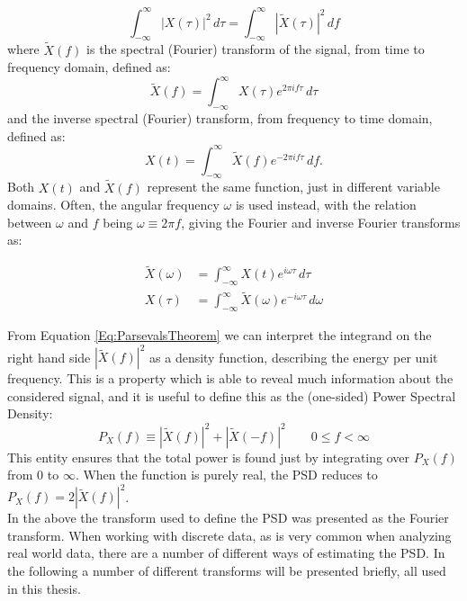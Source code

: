 \documentclass[../../CompleteThesis2/Complete_2ndDraft]{subfiles}
\begin{document}
\begin{equation}
	\int_{-\infty}^{\infty} |X(\tau)|^2 \, d\tau = \int_{-\infty}^{\infty} |\tilde{X}(\tau)|^2\, df
	\label{Eq:ParsevalsTheorem}
\end{equation}
where $\tilde{X}(f)$ is the spectral (Fourier) transform of the signal, from time to frequency domain, defined as:
\begin{equation}
	\tilde{X}(f) = \int_{-\infty}^{\infty} X(\tau) e^{2\pi i f \tau} \, d\tau
	\label{Eq:FourierTransform}
\end{equation}
and the inverse spectral (Fourier) transform, from frequency to time domain, defined as:
\begin{equation}
	X(t) = \int_{-\infty}^{\infty} \tilde{X}(f) e^{-2\pi i f \tau}\, df.
	\label{Eq:InverseFourierTransform}
\end{equation}
Both $X(t)$ and $\tilde{X}(f)$ represent the same function, just in different variable domains. Often, the angular frequency $\omega$ is used instead, with the relation between $\omega$ and $f$ being $\omega \equiv 2\pi f $, giving the Fourier and inverse Fourier transforms as:

\begin{equation}
	\begin{aligned}
		\tilde{X}(\omega) &= \int_{-\infty}^{\infty} X(t) e^{i\omega\tau}\, d\tau \\
		X(\tau) &= \int_{-\infty}^{\infty} \tilde{X}(\omega) e^{-i\omega\tau}\, d\omega
		\label{Eq:FourierTransformAngular}
	\end{aligned} 
\end{equation}

From Equation \ref{Eq:ParsevalsTheorem} we can interpret the integrand on the right hand side $|\tilde{X}(f)|^2$ as a density function, describing the energy per unit frequency. This is a property which is able to reveal much information about the considered signal, and it is useful to define this as the (one-sided) Power Spectral Density: 
\begin{equation}
	P_X(f) \equiv |\tilde{X}(f)|^2 + |\tilde{X}(-f)|^2 \qquad 0 \leq f < \infty
\end{equation}
This entity ensures that the total power is found just by integrating over $P_X(f)$ from 0 to $\infty$. When the function is purely real, the PSD reduces to $P_X(f) = 2|\tilde{X}(f)|^2$.\\
In the above the transform used to define the PSD was presented as the Fourier transform. When working with discrete data, as is very common when analyzing real world data, there are a number of different ways of estimating the PSD. In the following a number of different transforms will be presented briefly, all used in this thesis.
\newline
{}
\end{document}
